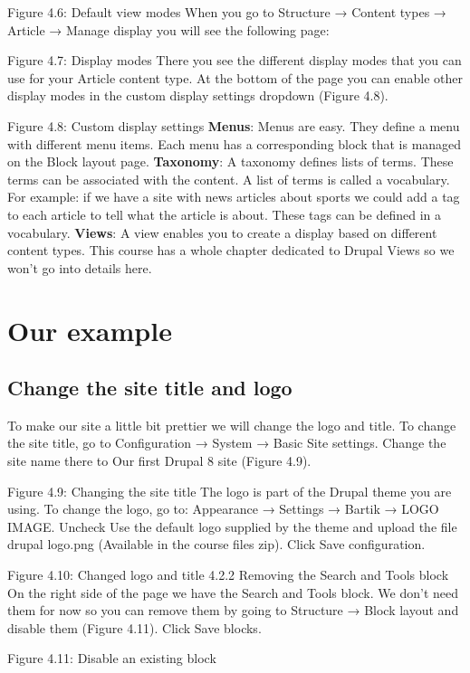 Figure 4.6: Default view modes
When you go to Structure → Content types → Article → Manage display you will see the following page:

Figure 4.7: Display modes
There you see the different display modes that you can use for your Article content type. At the bottom of the page you can enable other display modes in the custom display settings dropdown (Figure 4.8).

Figure 4.8: Custom display settings
\textbf{Menus}: Menus are easy. They define a menu with different menu items. Each menu has a corresponding block that is managed on the Block layout page.
\textbf{Taxonomy}: A taxonomy defines lists of terms. These terms can be associated with the content. A list of terms is called a vocabulary. For example: if we have a site with news articles about sports we could add a tag to each article to tell what the article is about. These tags can be defined in a vocabulary.
\textbf{Views}: A view enables you to create a display based on different content types. This course has a whole chapter dedicated to Drupal Views so we won’t go into details here.
\section{Our example}
\subsection{Change the site title and logo}
To make our site a little bit prettier we will change the logo and title. To change the site title, go to Configuration → System → Basic Site settings. Change the site name there to Our first Drupal 8 site (Figure 4.9).

Figure 4.9: Changing the site title
The logo is part of the Drupal theme you are using. To change the logo, go to: Appearance → Settings → Bartik → LOGO IMAGE. Uncheck Use the default logo supplied by the theme and upload the file drupal \textunderscore logo.png (Available in the course files zip). Click Save configuration.

Figure 4.10: Changed logo and title
4.2.2	Removing the Search and Tools block
On the right side of the page we have the Search and Tools block. We don’t need them for now so you can remove them by going to Structure → Block layout and disable  them (Figure 4.11). Click Save blocks.

Figure 4.11: Disable an existing block 
